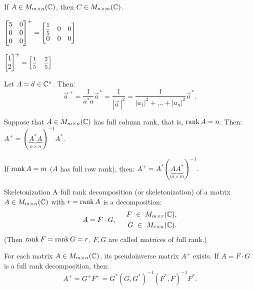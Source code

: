     \begin{note}{}{}
        If $A \in M_{m\times n} (\mathbb{C})$, then $C \in M_{n\times m}(\mathbb{C})$.
    \end{note}
    \begin{multicols}{2}
    \raggedcolumns
    \Ex $\begin{bmatrix}
        5 & 0 \\
        0 & 0 \\
        0 & 0
    \end{bmatrix}^+ = \displaystyle\begin{bmatrix}
        \medmath{\frac{1}{5}} & 0 & 0\\
        0 & 0 & 0
    \end{bmatrix}$

    \Ex $\begin{bmatrix}
        1 \\ 2
    \end{bmatrix}^+ = \begin{bmatrix}
        \medmath{\frac{1}{5}} & \medmath{\frac{2}{5}}
    \end{bmatrix}$
    \end{multicols}
    \Ex Let $A = \vec{a} \in \mathbb{C}^n$. Then: \[\vec{a}^{\, +} = \dfrac{1}{a^*a}\vec{a}^{\, *} = \dfrac{1}{|\vec{a}\,|^2} = \dfrac{1}{|a_1|^2 + \ldots + |a_n|^2} \vec{a}^{\, *}.\]
    \begin{proposition}{}{}
        Suppose that $A \in M_{m\times n}(\mathbb{C})$ has full column rank, that is, $\operatorname{rank} A = n$. Then:
        $A^+ = (\underbrace{A^*A}_{n\times n})^{-1}A^*.$
    \end{proposition}
    \begin{proposition}{}{}
        If $\operatorname{rank} A = m$ ($A$ has full row rank), then: $A^+ = A^* (\underbrace{AA^*}_{m\times m})^{-1}.$
    \end{proposition}
    \begin{definition}{Skeletonization}{}
        A full rank decomposition (or skeletonization) of a matrix $A \in M_{m\times n}(\mathbb{C})$ with $r = \operatorname{rank} A$ is a decomposition:
        \[
            A = F \cdot G, \hspace*{0.5cm} \begin{aligned}
                F\ \in \ M_{m\times r}(\mathbb{C}),\\
                G\ \in \ M_{r\times n}(\mathbb{C}).
            \end{aligned}  
        \]
        (Then $\operatorname{rank} F = \operatorname{rank} G = r$. $F, G$ are called matrices of full rank.)
    \end{definition}
    \begin{theorema}{}{}
        For each matrix $A \in M_{m\times n}(\mathbb{C})$, its pseudoinverse matrix $A^+$ exists. If $A = F \cdot G$ is a full rank decomposition, then:
        \[
            A^+ = G^+F^+ = G^*\left(G,G^*\right)^{-1} \left(F^*, F\right)^{-1}F^*. 
        \]
    \end{theorema}

